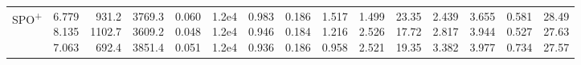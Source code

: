 \begin{landscape}
\begin{table}[t]
{\begin{tabular}{@{}lrrrrrrrrrrrrrr@{}}
SPO\textsuperscript{+} & \makecell[r]{6.779\\8.135\\7.063} & \makecell[r]{931.2\\1102.7\\692.4} & \makecell[r]{3769.3\\3609.2\\3851.4} & \makecell[r]{0.060\\0.048\\0.051} & \makecell[r]{1.2e4\\1.2e4\\1.2e4} & \makecell[r]{0.983\\0.946\\0.936} & \makecell[r]{0.186\\0.184\\0.186} & \makecell[r]{1.517\\1.216\\0.958} & \makecell[r]{1.499\\2.526\\2.521} & \makecell[r]{23.35\\17.72\\19.35} & \makecell[r]{2.439\\2.817\\3.382} & \makecell[r]{3.655\\3.944\\3.977} & \makecell[r]{0.581\\0.527\\0.734} & \makecell[r]{28.49\\27.63\\27.57} \\

\end{tabular}}
\end{table}
\end{landscape}
